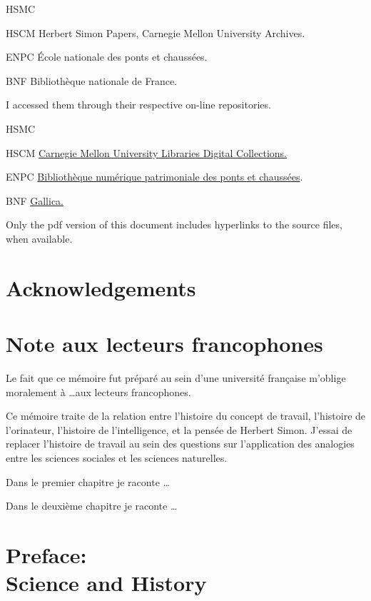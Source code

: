 \documentclass[version=last,draft=true,paper=A4,portrait,twoside=true,twocolumn=false,headinclude=false,footinclude=false,fontsize=11,BCOR=20mm,DIV=calc,pagesize=auto,titlepage=firstiscover,mpinclude=false,open=right,chapterprefix=true,numbers=autoendperiod,headsepline=false,parskip=false]{scrbook}
\begin{document}
\begin{labeling}[:]{HSMC} 
\item[HSCM] Herbert Simon Papers, Carnegie Mellon University Archives.
\item[ENPC] École nationale des ponts et chaussées.
\item[BNF] Bibliothèque nationale de France. 
\end{labeling}

I accessed them through their respective on-line repositories.

\begin{labeling}[:]{HSMC} 
\item[HSCM] \href{https://digitalcollections.library.cmu.edu/portal/index.jsp}{Carnegie Mellon University Libraries Digital Collections.} 
\item[ENPC] \href{https://patrimoine.enpc.fr/}{Bibliothèque numérique patrimoniale des ponts et chaussées}.
\item[BNF] \href{https://gallica.bnf.fr/}{Gallica.}
\end{labeling}

Only the pdf version of this document includes hyperlinks to the source
files, when available.

\chapter{Acknowledgements} 
\lipsum
\chapter{Note aux lecteurs francophones} 
Le fait que ce mémoire fut préparé au sein d'une université française
m'oblige moralement à \ldots aux lecteurs francophones. 

Ce mémoire traite de la relation entre l'histoire du concept de travail,
l'histoire de l'orinateur, l'histoire de l'intelligence, et la pensée de
Herbert Simon. J'essai de replacer l'histoire de travail au sein des
questions sur  l'application des analogies entre les sciences sociales et
les sciences naturelles.  

Dans le premier chapitre je raconte \ldots 

Dans le deuxième chapitre je raconte \ldots 

\lipsum

\chapter[Preface]{Preface:\\ Science and History} 
\end{document}
